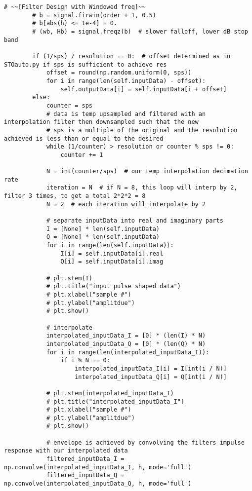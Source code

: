 \begin{lstlisting}[breaklines]
        # ~~[Filter Design with Windowed freq]~~
        # b = signal.firwin(order + 1, 0.5)
        # b[abs(h) <= 1e-4] = 0.
        # (wb, Hb) = signal.freqz(b)  # slower falloff, lower dB stop band

        if (1/sps) / resolution == 0:  # offset determined as in STOauto.py if sps is sufficient to achieve res
            offset = round(np.random.uniform(0, sps))
            for i in range(len(self.inputData) - offset):
                self.outputData[i] = self.inputData[i + offset]
        else:
            counter = sps
            # data is temp upsampled and filtered with an interpolation filter then downsampled such that the new
            # sps is a multiple of the original and the resolution achieved is less than or equal to the desired
            while (1/counter) > resolution or counter % sps != 0:
                counter += 1

            N = int(counter/sps)  # our temp interpolation decimation rate
            iteration = N  # if N = 8, this loop will interp by 2, filter 3 times, to get a total 2*2*2 = 8
            N = 2  # each iteration will interpolate by 2

            # separate inputData into real and imaginary parts
            I = [None] * len(self.inputData)
            Q = [None] * len(self.inputData)
            for i in range(len(self.inputData)):
                I[i] = self.inputData[i].real
                Q[i] = self.inputData[i].imag

            # plt.stem(I)
            # plt.title("input pulse shaped data")
            # plt.xlabel("sample #")
            # plt.ylabel("amplitdue")
            # plt.show()

            # interpolate
            interpolated_inputData_I = [0] * (len(I) * N)
            interpolated_inputData_Q = [0] * (len(Q) * N)
            for i in range(len(interpolated_inputData_I)):
                if i % N == 0:
                    interpolated_inputData_I[i] = I[int(i / N)]
                    interpolated_inputData_Q[i] = Q[int(i / N)]

            # plt.stem(interpolated_inputData_I)
            # plt.title("interpolated_inputData_I")
            # plt.xlabel("sample #")
            # plt.ylabel("amplitdue")
            # plt.show()

            # envelope is achieved by convolving the filters impulse response with our interpolated data
            filtered_inputData_I = np.convolve(interpolated_inputData_I, h, mode='full')
            filtered_inputData_Q = np.convolve(interpolated_inputData_Q, h, mode='full')


\end{lstlisting}
